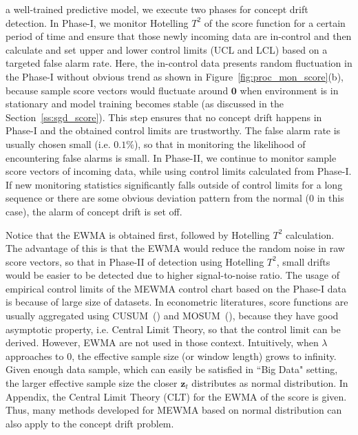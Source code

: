 \documentclass[twoside,11pt]{article}
\begin{document}
  a well-trained  predictive model, we execute two phases for concept drift detection. In Phase-I, we {monitor Hotelling $T^2$ of the score function for a certain period of time and ensure that those newly incoming data are in-control and} then calculate and set {upper and lower} control limits {(UCL and LCL)} based on a targeted false alarm rate. Here, the in-control data presents random fluctuation in the Phase-I without obvious trend as shown in Figure~\ref{fig:proc_mon_score}(b), because sample score vectors would fluctuate around $\bm {0}$ when environment is in stationary and model training becomes stable (as discussed in the Section~\ref{ss:sgd_score}). This step ensures that no concept drift happens in Phase-I and the obtained control limits are trustworthy. The false alarm rate is usually chosen small (i.e. $0.1\%$), so that in monitoring the likelihood of encountering false alarms is small. In Phase-II, we continue to monitor sample score vectors of incoming data, while using control limits calculated from Phase-I. If new {monitoring statistics} significantly falls outside of control limits for a long sequence or there are some obvious deviation pattern from the normal ($0$ in this case), the alarm of concept drift is set off.

Notice that the EWMA is obtained first, followed by Hotelling $T^2$ calculation. The advantage of this is that the EWMA would reduce the random noise in raw score vectors, so that in Phase-II of detection using Hotelling $T^2$, small drifts would be easier to be detected due to higher signal-to-noise ratio. The usage of empirical control limits of the MEWMA control chart based on the Phase-I data is because of large size of datasets. In econometric literatures, score functions are usually aggregated using CUSUM~(\cite{zeileis2007generalized}) and MOSUM~(\cite{chu1995mosum}), because they have good asymptotic property, i.e. Central Limit Theory, so that the control limit can be derived. However, EWMA are not used in those context. Intuitively, when $ \lambda$ approaches to $0$, the effective sample size (or window length) grows to infinity. Given enough data sample, which can easily be satisfied in ``Big Data" setting, the larger effective sample size the closer $\bm {z}_t$ distributes as normal distribution. In Appendix, the Central Limit Theory (CLT) for the EWMA of the score is given. Thus, many methods developed for MEWMA based on normal distribution can also apply to the concept drift problem. 
\end{document}
